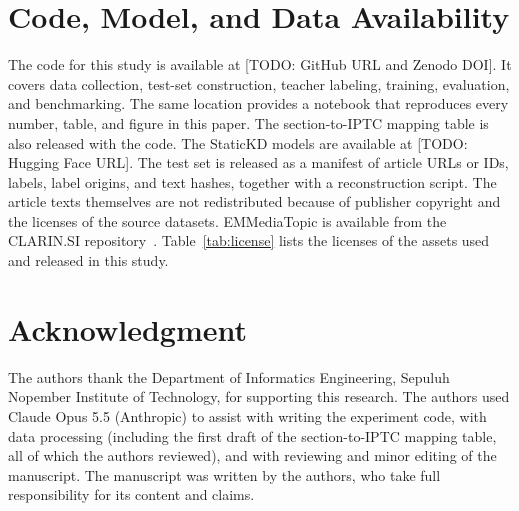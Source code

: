 \documentclass[journal]{IEEEtran}
\DeclareRobustCommand{\todo}[1]{{\color{red}[TODO: #1]}}
\begin{document}
\section*{Code, Model, and Data Availability}
The code for this study is available at \todo{GitHub URL and Zenodo DOI}. It covers data collection, test-set construction, teacher labeling, training, evaluation, and benchmarking. The same location provides a notebook that reproduces every number, table, and figure in this paper. The section-to-IPTC mapping table is also released with the code. The StaticKD models are available at \todo{Hugging Face URL}. The test set is released as a manifest of article URLs or IDs, labels, label origins, and text hashes, together with a reconstruction script. The article texts themselves are not redistributed because of publisher copyright and the licenses of the source datasets. EMMediaTopic is available from the CLARIN.SI repository~\cite{emmediatopic2025}. Table~\ref{tab:license} lists the licenses of the assets used and released in this study.

\begin{table}[!t]
\caption{Licenses of the Assets Used and Released}
\label{tab:license}
\centering
\footnotesize
\setlength{\tabcolsep}{3pt}
\end{table}

\section*{Acknowledgment}
The authors thank the Department of Informatics Engineering, Sepuluh Nopember Institute of Technology, for supporting this research. The authors used Claude Opus 5.5 (Anthropic) to assist with writing the experiment code, with data processing (including the first draft of the section-to-IPTC mapping table, all of which the authors reviewed), and with reviewing and minor editing of the manuscript. The manuscript was written by the authors, who take full responsibility for its content and claims.



\end{document}
